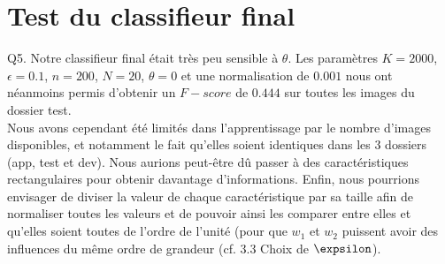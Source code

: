 \documentclass[a4paper,11pt]{article}
\begin{document}
\section{Test du classifieur final}

Q5. Notre classifieur final était très peu sensible à $\theta$. Les paramètres $K=2000$, $\epsilon = 0.1$, $n = 200$, $N = 20$, $\theta = 0$ et une normalisation de $0.001$ nous ont néanmoins permis d’obtenir un $F-score$ de $0.444$ sur toutes les images du dossier test.\\

Nous avons cependant été limités dans l’apprentissage par le nombre d’images disponibles, et notamment le fait qu’elles soient identiques dans les 3 dossiers (app, test et dev). Nous aurions peut-être dû passer à des caractéristiques rectangulaires pour obtenir davantage d’informations. Enfin, nous pourrions envisager de diviser la valeur de chaque caractéristique par sa taille afin de normaliser toutes les valeurs et de pouvoir ainsi les comparer entre elles et qu’elles soient toutes de l’ordre de l’unité (pour que $w_1$ et $w_2$ puissent avoir des influences du même ordre de grandeur (cf. 3.3 Choix de $\expsilon$).
\end{document}
